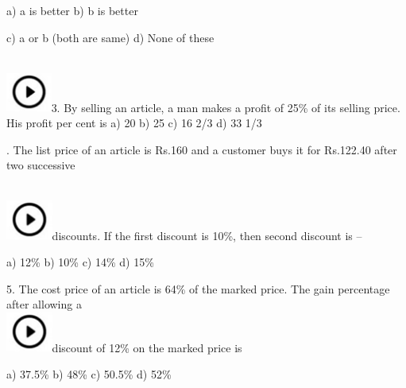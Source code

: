 \documentclass{article}
\begin{document}
	\noindent a) a is better                                                  b) b is better
	
	\noindent 
	
	\noindent c) a or b (both are same)                             d) None of these
	
	\noindent 
	
	\noindent 
	
	\noindent 
	
	\noindent \noindent \\ \includegraphics*[width=0.59in, height=0.52in]{images/image1}3.   By selling an article, a man makes a profit of 25\% of its selling price. His profit per cent is a) 20                        b) 25                 c) 16 2/3           d) 33 1/3
	
	\noindent 
	
	\noindent 
	
	.   The list price of an article is Rs.160 and a customer buys it for Rs.122.40 after two successive
	
	\noindent \noindent \\ \includegraphics*[width=0.60in, height=0.52in]{images/image1}discounts. If the first discount is 10\%, then second discount is --
	
	\noindent a) 12\%                    b) 10\%              c) 14\%              d) 15\%
	
	\noindent 
	
	5.   The cost price of an article is 64\% of the marked price. The gain percentage after allowing a \noindent \\ \includegraphics*[width=0.60in, height=0.52in]{images/image1}discount of 12\% on the marked price is
	
	\noindent a) 37.5\%                 b) 48\%              c) 50.5\%           d) 52\%
	
	\noindent 
	
	\noindent 
	
\end{document}
